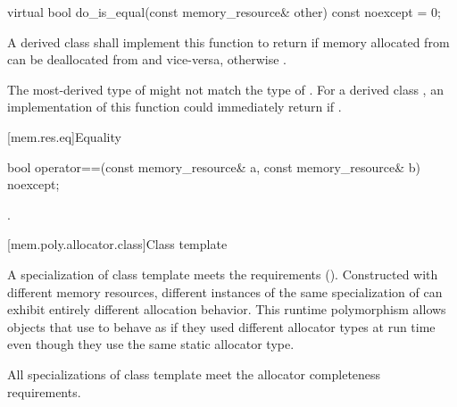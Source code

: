 %
\begin{itemdecl}
virtual bool do_is_equal(const memory_resource& other) const noexcept = 0;
\end{itemdecl}

\begin{itemdescr}
\pnum
\returns
A derived class shall implement this function to return  if memory allocated from  can be deallocated from  and vice-versa,
otherwise .
\begin{note}
The most-derived type of  might not match the type of .
For a derived class , an implementation of this function
could immediately return 
if .
\end{note}
\end{itemdescr}

[mem.res.eq]{Equality}

%
\begin{itemdecl}
bool operator==(const memory_resource& a, const memory_resource& b) noexcept;
\end{itemdecl}

\begin{itemdescr}
\pnum
\returns
{}.
\end{itemdescr}

[mem.poly.allocator.class]{Class template }

\pnum
A specialization of class template 
meets the  requirements ().
Constructed with different memory resources,
different instances of the same specialization of 
can exhibit entirely different allocation behavior.
This runtime polymorphism allows objects that use 
to behave as if they used different allocator types at run time
even though they use the same static allocator type.

\pnum
All specializations of class template 
meet the allocator completeness requirements.

